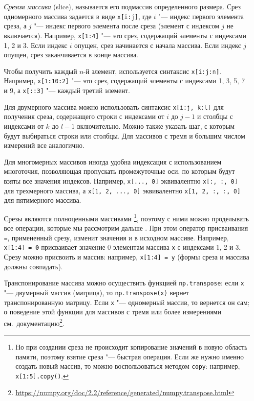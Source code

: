 \emph{Срезом массива} (slice), называется его подмассив определенного размера.
Срез одномерного массива задается в виде \verb"x[i:j]", где $i$ "--- индекс первого элемента среза, а $j$ "--- индекс первого элемента после среза (элемент с индексом $j$ не включается).
Например, \verb"x[1:4]" "--- это срез, содержащий элементы с индексами 1, 2 и 3.
Если индекс $i$ опущен, срез начинается с начала массива.
Если индекс $j$ опущен, срез заканчивается в конце массива.

Чтобы получить каждый $n$-й элемент, используется синтаксис \verb"x[i:j:n]".
Например, \verb"x[1:10:2]" "--- это срез, содержащий элементы с индексами 1, 3, 5, 7 и 9, а \verb"x[::3]" "--- каждый третий элемент.

Для двумерного массива можно использовать синтаксис \verb"x[i:j, k:l]" для получения среза, содержащего строки с индексами от $i$ до $j-1$ и столбцы с индексами от $k$ до $l-1$ включительно.
Можно также указать шаг, с которым будут выбираться строки или столбцы.
Для массивов с тремя и большим числом измерений все аналогично.

Для многомерных массивов иногда удобна индексация с использованием многоточия, позволяющая пропускать промежуточные оси, по которым будут взяты все значения индексов.
Например, \verb"x[..., 0]" эквивалентно \verb"x[:, :, 0]" для трехмерного массива, а \verb"x[1, 2, ..., 0]" эквивалентно \verb"x[1, 2, :, :, 0]" для пятимерного массива. 

Срезы являются полноценными массивами%
\footnote{Но при создании среза не происходит копирование значений в новую область памяти, поэтому взятие среза "--- быстрая операция.
Если же нужно именно создать новый массив, то можно воспользоваться методом \verb"copy": например, \verb"x[1:5].copy()".},
поэтому с ними можно проделывать все операции, которые мы рассмотрим дальше%
.
При этом оператор присваивания \verb"=", примененный срезу, изменит значения и в исходном массиве. 
Например, \verb"x[1:4] = 0" присваивает значение 0 элементам массива \verb"x" с индексами 1, 2 и 3.
Срезу можно присвоить и массив: например, \verb"x[1:4] = y" (формы среза и массива должны совпадать).

Транспонирование массива можно осуществить функцией \verb"np.transpose": если \verb"x" "--- двумерный массив (матрица), то \verb"np.transpose(x)" вернет транспонированную матрицу.
Если \verb"x" "--- одномерный массив, то вернется он сам; о поведение этой функции для массивов с тремя или более измерениями см.~документацию\footnote{\url{https://numpy.org/doc/2.2/reference/generated/numpy.transpose.html}}.


